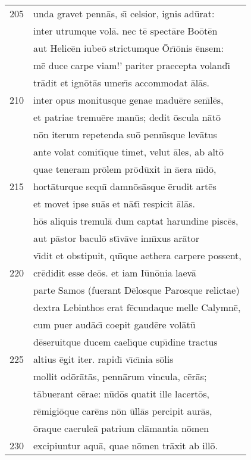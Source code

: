 \documentclass[paper=6in:9in,pagesize=pdftex,
               headinclude=on,footinclude=on,12pt]{scrbook}
\begin{document}
\begin{longtable}[p]{ r l }
205 & unda gravet penn\=as, s\={\i} celsior, ignis ad\=urat:\\ 
 & inter utrumque vol\=a. nec t\=e spect\=are Bo\=ot\=en\\ 
 & aut Helic\=en iube\=o strictumque \=Or\={\i}\=onis \=ensem:\\ 
 & m\=e duce carpe viam!' pariter praecepta voland\={\i}\\ 
 & tr\=adit et ign\=ot\=as umer\={\i}s accommodat \=al\=as.\\ 
210 & inter opus monitusque genae madu\=ere sen\={\i}l\=es,\\ 
 & et patriae tremu\=ere man\=us; dedit \=oscula n\=at\=o\\ 
 & n\=on iterum repetenda su\=o penn\={\i}sque lev\=atus\\ 
 & ante volat comit\={\i}que timet, velut \=ales, ab alt\=o\\ 
 & quae teneram pr\=olem pr\=od\=uxit in \=aera n\={\i}d\=o,\\ 
215 & hort\=aturque sequ\={\i} damn\=os\=asque \=erudit art\=es\\ 
 & et movet ipse su\=as et n\=at\={\i} respicit \=al\=as.\\ 
 & h\=os aliquis tremul\=a dum captat harundine pisc\=es,\\ 
 & aut p\=astor bacul\=o st\={\i}v\=ave inn\={\i}xus ar\=ator\\ 
 & v\={\i}dit et obstipuit, qu\={\i}que aethera carpere possent,\\ 
220 & cr\=edidit esse de\=os. et iam I\=un\=onia laev\=a\\ 
 & parte Samos (fuerant D\=elosque Parosque relictae)\\ 
 & dextra Lebinthos erat f\=ecundaque melle Calymn\=e,\\ 
 & cum puer aud\=ac\={\i} coepit gaud\=ere vol\=at\=u\\ 
 & d\=eseruitque ducem cael\={\i}que cup\={\i}dine tractus\\ 
225 & altius \=egit iter. rapid\={\i} v\={\i}c\={\i}nia s\=olis\\ 
 & mollit od\=or\=at\=as, penn\=arum vincula, c\=er\=as;\\ 
 & t\=abuerant c\=erae: n\=ud\=os quatit ille lacert\=os,\\ 
 & r\=emigi\=oque car\=ens n\=on \=ull\=as percipit aur\=as,\\ 
 & \=oraque caerule\=a patrium cl\=amantia n\=omen\\ 
230 & excipiuntur aqu\=a, quae n\=omen tr\=axit ab ill\=o.\\ 

\end{longtable}
\end{document}
